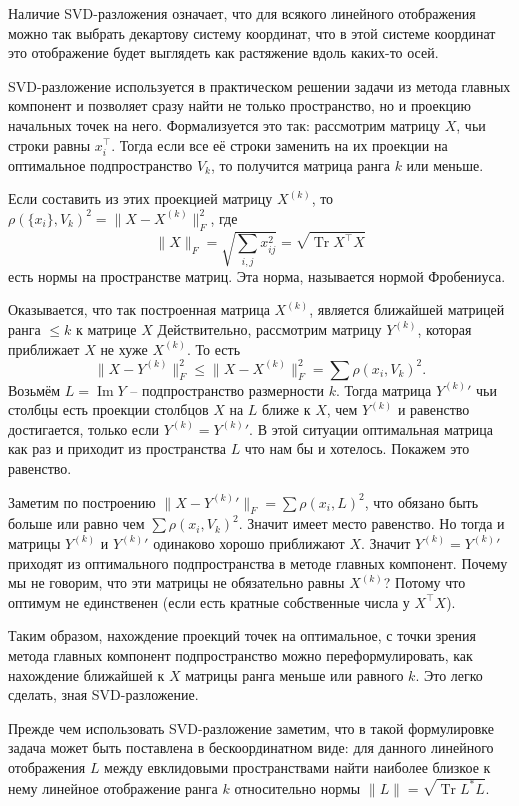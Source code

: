 \documentclass[12pt,a4paper,oneside]{book}
\theoremstyle{definition}
\renewcommand{\leq}{\leqslant}
\renewcommand{\Im}{\operatorname{Im}}
\newcommand{\Tr}{\operatorname{Tr}}
\begin{document}
Наличие SVD-разложения означает, что для всякого линейного отображения можно так выбрать декартову систему координат, что в этой системе координат это отображение будет выглядеть как растяжение вдоль каких-то осей.





SVD-разложение используется в практическом решении задачи из метода главных компонент и позволяет сразу найти не только пространство, но и проекцию начальных точек на него. Формализуется это так: рассмотрим матрицу $X$, чьи строки равны $x_i^{\top}$. Тогда если все её строки заменить на их проекции на оптимальное подпространство $V_k$, то получится матрица ранга $k$ или меньше.

Если составить из этих проекцией матрицу $X^{(k)}$, то $\rho(\{x_i\}, V_k)^2= \|X-X^{(k)}\|_F^2 $, где 
$$\|X\|_F=\sqrt{\sum_{i,j} x_{ij}^2}=\sqrt{\Tr X^{\top}X}$$
есть нормы на пространстве матриц. Эта норма, называется нормой Фробениуса.

Оказывается, что так построенная матрица $X^{(k)}$, является ближайшей матрицей ранга $\leq k$ к матрице $X$
Действительно, рассмотрим матрицу $Y^{(k)}$, которая приближает $X$ не хуже $X^{(k)}$. То есть 
$$\|X -Y^{(k)}\|_F^2 \leq \| X-X^{(k)}\|_F^2= \sum \rho(x_i, V_k)^2.$$
Возьмём $L=\Im Y$ -- подпространство размерности $k$. Тогда матрица ${Y^{(k)}}'$ чьи столбцы есть проекции столбцов $X$ на $L$ ближе к $X$, чем $Y^{(k)}$ и равенство достигается, только если $Y^{(k)}={Y^{(k)}}'$. В этой ситуации оптимальная матрица как раз и приходит из пространства $L$ что нам бы и хотелось. Покажем это равенство.

Заметим по построению $\| X - {Y^{(k)}}'\|_F = \sum \rho (x_i, L)^2$, что обязано быть больше или равно чем $\sum \rho(x_i, V_k)^2$. Значит имеет место равенство. Но тогда и матрицы $Y^{(k)}$ и ${Y^{(k)}}'$ одинаково хорошо приближают $X$. Значит $Y^{(k)}={Y^{(k)}}'$ приходят из оптимального подпространства в методе главных компонент. Почему мы не говорим, что эти матрицы не обязательно равны $X^{(k)}$? Потому что оптимум не единственен (если есть кратные собственные числа у $X^\top X$).


Таким образом, нахождение проекций точек на оптимальное, с точки зрения метода главных компонент подпространство можно переформулировать, как нахождение ближайшей к $X$ матрицы ранга меньше или равного $k$. Это легко сделать, зная SVD-разложение.

Прежде чем использовать SVD-разложение заметим, что в такой формулировке задача может быть поставлена в бескоординатном виде: для данного линейного отображения $L$ между евклидовыми пространствами найти наиболее близкое к нему линейное отображение ранга $k$ относительно нормы $\|L\|=\sqrt{\Tr L^*L}$.
\end{document}
